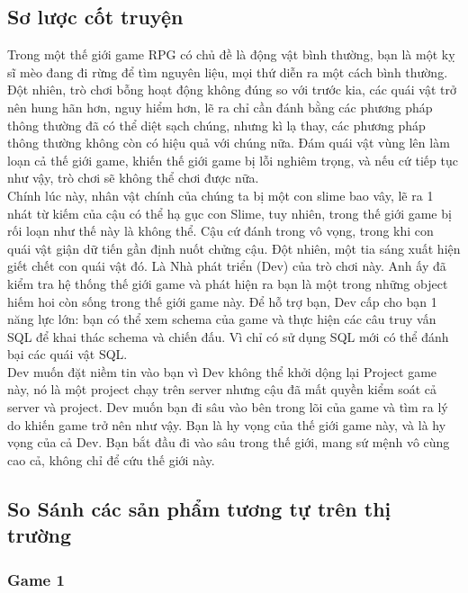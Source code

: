\subsection{Sơ lược cốt truyện}
\hspace*{1cm} Trong một thế giới game RPG có chủ đề là động vật bình thường, bạn là một kỵ sĩ mèo đang đi rừng để tìm nguyên liệu, mọi thứ diễn ra một cách bình thường. \\
\hspace*{1cm} Đột nhiên, trò chơi bỗng hoạt động không đúng so với trước kia, các quái vật trở nên hung hãn hơn, nguy hiểm hơn, lẽ ra chỉ cần đánh bằng các phương pháp thông thường đã có thể diệt sạch chúng, nhưng kì lạ thay, các phương pháp thông thường không còn có hiệu quả với chúng nữa. Đám quái vật vùng lên làm loạn cả thế giới game, khiến thế giới game bị lỗi nghiêm trọng, và nếu cứ tiếp tục như vậy, trò chơi sẽ không thể chơi được nữa.\\
\hspace*{1cm} Chính lúc này, nhân vật chính của chúng ta bị một con slime bao vây, lẽ ra 1 nhát từ kiếm của cậu có thể hạ gục con Slime, tuy nhiên, trong thế giới game bị rối loạn như thế này là không thể. Cậu cứ đánh trong vô vọng, trong khi con quái vật giận dữ tiến gần định nuốt chửng cậu. Đột nhiên, một tia sáng xuất hiện giết chết con quái vật đó. Là Nhà phát triển (Dev) của trò chơi này. Anh ấy đã kiểm tra hệ thống thế giới game và phát hiện ra bạn là một trong những object hiếm hoi còn sống trong thế giới game này. Để hỗ trợ bạn, Dev cấp cho bạn 1 năng lực lớn: bạn có thể xem schema của game và thực hiện các câu truy vấn SQL để khai thác schema và chiến đấu. Vì chỉ có sử dụng SQL mới có thể đánh bại các quái vật SQL. \\
\hspace*{1cm} Dev muốn đặt niềm tin vào bạn vì Dev không thể khởi dộng lại Project game này, nó là một project chạy trên server nhưng cậu đã mất quyền kiểm soát cả server và project. Dev muốn bạn đi sâu vào bên trong lõi của game và tìm ra lý do khiến game trở nên như vậy. Bạn là hy vọng của thế giới game này, và là hy vọng của cả Dev. Bạn bắt đầu đi vào sâu trong thế giới, mang sứ mệnh vô cùng cao cả, không chỉ để cứu thế giới này.

\subsection{So Sánh các sản phẩm tương tự trên thị trường}
\subsubsection{Game 1}
